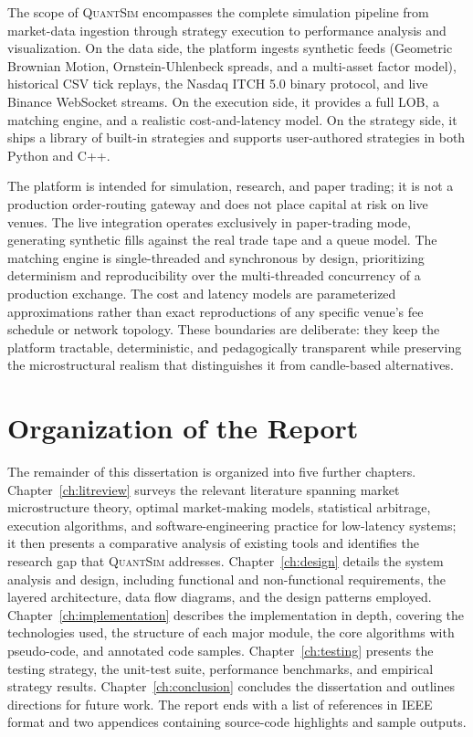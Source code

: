 \documentclass[12pt,oneside,a4paper]{report}
\newcommand{\quantsim}{\textsc{QuantSim}}
\begin{document}
The scope of \quantsim{} encompasses the complete simulation pipeline from market-data ingestion through strategy execution to performance analysis and visualization. On the data side, the platform ingests synthetic feeds (Geometric Brownian Motion, Ornstein-Uhlenbeck spreads, and a multi-asset factor model), historical CSV tick replays, the Nasdaq ITCH 5.0 binary protocol, and live Binance WebSocket streams. On the execution side, it provides a full LOB, a matching engine, and a realistic cost-and-latency model. On the strategy side, it ships a library of built-in strategies and supports user-authored strategies in both Python and C++.

The platform is intended for simulation, research, and paper trading; it is not a production order-routing gateway and does not place capital at risk on live venues. The live integration operates exclusively in paper-trading mode, generating synthetic fills against the real trade tape and a queue model. The matching engine is single-threaded and synchronous by design, prioritizing determinism and reproducibility over the multi-threaded concurrency of a production exchange. The cost and latency models are parameterized approximations rather than exact reproductions of any specific venue's fee schedule or network topology. These boundaries are deliberate: they keep the platform tractable, deterministic, and pedagogically transparent while preserving the microstructural realism that distinguishes it from candle-based alternatives.

\section{Organization of the Report}
\label{sec:organization}

The remainder of this dissertation is organized into five further chapters. Chapter~\ref{ch:litreview} surveys the relevant literature spanning market microstructure theory, optimal market-making models, statistical arbitrage, execution algorithms, and software-engineering practice for low-latency systems; it then presents a comparative analysis of existing tools and identifies the research gap that \quantsim{} addresses. Chapter~\ref{ch:design} details the system analysis and design, including functional and non-functional requirements, the layered architecture, data flow diagrams, and the design patterns employed. Chapter~\ref{ch:implementation} describes the implementation in depth, covering the technologies used, the structure of each major module, the core algorithms with pseudo-code, and annotated code samples. Chapter~\ref{ch:testing} presents the testing strategy, the unit-test suite, performance benchmarks, and empirical strategy results. Chapter~\ref{ch:conclusion} concludes the dissertation and outlines directions for future work. The report ends with a list of references in IEEE format and two appendices containing source-code highlights and sample outputs.
\end{document}
